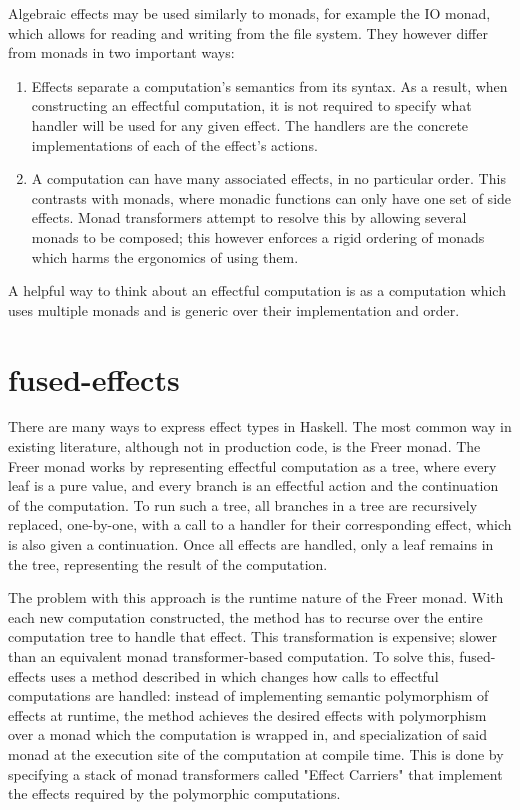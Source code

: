 \documentclass[conference]{IEEEtran}
\begin{document}
Algebraic effects may be used similarly to monads, for example the IO monad, which allows for reading and writing from the file system. They however differ from monads in two important ways:
\begin{enumerate}
    \item Effects separate a computation's semantics from its syntax. As a result, when constructing an effectful computation, it is not required to specify what handler will be used for any given effect. The handlers are the concrete implementations of each of the effect's actions.
    \item A computation can have many associated effects, in no particular order. This contrasts with monads, where monadic functions can only have one set of side effects. Monad transformers attempt to resolve this by allowing several monads to be composed; this however enforces a rigid ordering of monads which harms the ergonomics of using them.
\end{enumerate}

A helpful way to think about an effectful computation is as a computation which uses multiple monads and is generic over their implementation and order.

\section{fused-effects}
\label{app:FusedEffectsAppendix}
There are many ways to express effect types in Haskell. The most common way in existing literature, although not in production code, is the Freer monad. The Freer monad works by representing effectful computation as a tree, where every leaf is a pure value, and every branch is an effectful action and the continuation of the computation. To run such a tree, all branches in a tree are recursively replaced, one-by-one, with a call to a handler for their corresponding effect, which is also given a continuation. Once all effects are handled, only a leaf remains in the tree, representing the result of the computation.

The problem with this approach is the runtime nature of the Freer monad. With each new computation constructed, the method has to recurse over the entire computation tree to handle that effect. This transformation is expensive; slower than an equivalent monad transformer-based computation. To solve this, fused-effects \cite{FusedEffects} uses a method described in \cite{fusionforfree} which changes how calls to effectful computations are handled: instead of implementing semantic polymorphism of effects at runtime, the method achieves the desired effects with polymorphism over a monad which the computation is wrapped in, and specialization of said monad at the execution site of the computation at compile time. This is done by specifying a stack of monad transformers called "Effect Carriers" that implement the effects required by the polymorphic computations.
\end{document}
